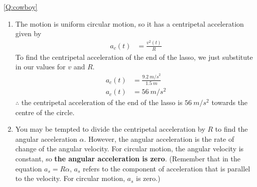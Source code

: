 \begin{solution}{\ref{Q:cowboy}}
{\begin{enumerate}[label=\alph*)]
\item The motion is uniform circular motion, so it has a centripetal acceleration given by
\begin{align*}
a_c(t)&=\frac{v^2(t)}{R}
\end{align*}
To find the centripetal acceleration of the end of the lasso, we just substitute in our values for $v$ and $R$.
\begin{align*}
a_c(t)&=\frac{\SI{9.2}{m/s}^2}{\SI{1.5}{m}}\\
a_c(t)&=\SI{56}{m/s^2}
\end{align*}
$\therefore$ the centripetal acceleration of the end of the lasso is $\SI{56}{m/s^2}$ towards the centre of the circle. 
\item You may be tempted to divide the centripetal acceleration by $R$ to find the angular acceleration $\alpha$. However, the angular acceleration is the rate of change of the angular velocity. For circular motion, the angular velocity is constant, so \textbf{the angular acceleration is zero}. (Remember that in the equation $a_s=R\alpha$, $a_s$ refers to the component of acceleration that is parallel to the velocity. For circular motion, $a_s$ is zero.)
\end{enumerate}}
\end{solution}